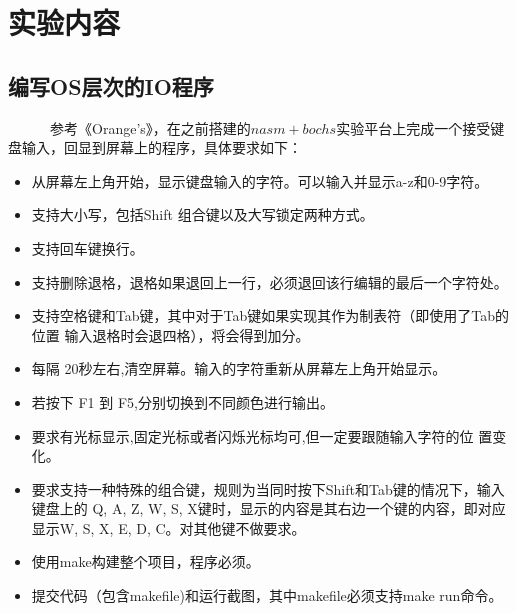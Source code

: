 \documentclass[a4paper]{article}
\title{\Huge \heiti{操作系统实验（三）}}
\author{\lishu{南京大学软件学院}}
\date{\normalsize 2015.5}
\begin{document}
\maketitle

\renewcommand{\abstractname}{实验重点}

\begin{abstract}
本次作业重点：操作系统的中断与异常，IO操作以及机制，实模式和保护模式下的中断异同。
\end{abstract}

\section{实验内容}
\subsection{编写OS层次的IO程序}
~~~~~~参考《Orange's》，在之前搭建的$nasm+bochs$实验平台上完成一个接受键盘输入，回显到屏幕上的程序，具体要求如下：
	\begin{itemize}
		\item 从屏幕左上角开始，显示键盘输入的字符。可以输入并显示a-z和0-9字符。
		\item 支持大小写，包括Shift 组合键以及大写锁定两种方式。
		\item 支持回车键换行。
		\item 支持删除退格，退格如果退回上一行，必须退回该行编辑的最后一个字符处。
		\item 支持空格键和Tab键，其中对于Tab键如果实现其作为制表符（即使用了Tab的位置
		输入退格时会退四格），将会得到加分。
		\item 每隔 20秒左右,清空屏幕。输入的字符重新从屏幕左上角开始显示。
		\item 若按下 F1 到 F5,分别切换到不同颜色进行输出。
		\item 要求有光标显示,固定光标或者闪烁光标均可,但一定要跟随输入字符的位
置变化。
		\item 要求支持一种特殊的组合键，规则为当同时按下Shift和Tab键的情况下，输入键盘上的
		Q, A, Z, W, S, X键时，显示的内容是其右边一个键的内容，即对应显示W, S, X, E, D, C。对其他键不做要求。
		\item 使用make构建整个项目，程序必须\underline{}。
		\item 提交代码（包含makefile)和运行截图，其中makefile必须支持make run命令。
	\end{itemize}
\end{document}
